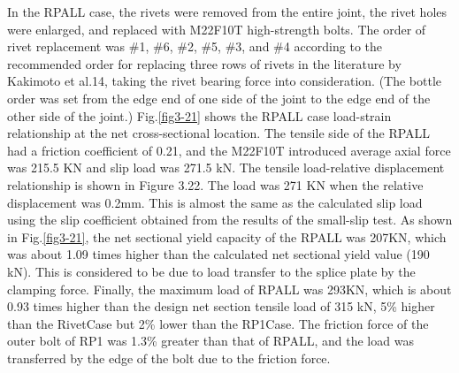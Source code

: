 In the RPALL case, the rivets were removed from the entire joint, the rivet holes were enlarged, and replaced with M22F10T high-strength bolts. The order of rivet replacement was \#1, \#6, \#2, \#5, \#3, and \#4 according to the recommended order for replacing three rows of rivets in the literature by Kakimoto et al.14, taking the rivet bearing force into consideration. (The bottle order was set from the edge end of one side of the joint to the edge end of the other side of the joint.)
Fig.\ref{fig3-21} shows the RPALL case load-strain relationship at the net cross-sectional location. The tensile side of the RPALL had a friction coefficient of 0.21, and the M22F10T introduced average axial force was 215.5 KN and slip load was 271.5 kN.
The tensile load-relative displacement relationship is shown in Figure 3.22. The load was 271 KN when the relative displacement was 0.2mm. This is almost the same as the calculated slip load using the slip coefficient obtained from the results of the small-slip test.
As shown in Fig.\ref{fig3-21}, the net sectional yield capacity of the RPALL was 207KN, which was about 1.09 times higher than the calculated net sectional yield value (190 kN). This is considered to be due to load transfer to the splice plate by the clamping force. Finally, the maximum load of RPALL was 293KN, which is about 0.93 times higher than the design net section tensile load of 315 kN, 5\% higher than the RivetCase but 2\% lower than the RP1Case. The friction force of the outer bolt of RP1 was 1.3\% greater than that of RPALL, and the load was transferred by the edge of the bolt due to the friction force.

